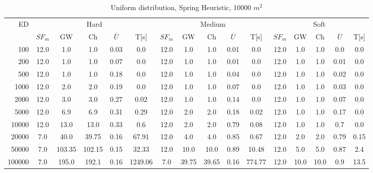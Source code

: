 \begin{table}[htb]
	\centering
	\begin{tabular}{|r|c|c|c|c|c|c|c|c|c|c|c|c|c|c|c|} 
		\multirow{2}{*}{ED} & \multicolumn{5}{c|}{Hard} & \multicolumn{5}{c|}{Medium} &\multicolumn{5}{c|}{Soft} \\ 
		\cline{2-16} 
		&$SF_{m}$&GW & Ch & $\overline{U}$&T[s] &$SF_{m}$&GW & Ch & $\overline{U}$ &T[s] &$SF_{m}$&GW & Ch & $\overline{U}$  & T[s]  \\ 
		\hline 
		100 & 12.0 & 1.0 & 1.0 & 0.03 & 0.0 & 12.0 & 1.0 & 1.0 & 0.01 & 0.0 & 12.0 & 1.0 & 1.0 & 0.0 & 0.0\\ 
		200 & 12.0 & 1.0 & 1.0 & 0.07 & 0.0 & 12.0 & 1.0 & 1.0 & 0.01 & 0.0 & 12.0 & 1.0 & 1.0 & 0.01 & 0.0\\ 
		500 & 12.0 & 1.0 & 1.0 & 0.18 & 0.0 & 12.0 & 1.0 & 1.0 & 0.04 & 0.0 & 12.0 & 1.0 & 1.0 & 0.02 & 0.0\\ 
		1000 & 12.0 & 2.0 & 2.0 & 0.19 & 0.0 & 12.0 & 1.0 & 1.0 & 0.07 & 0.0 & 12.0 & 1.0 & 1.0 & 0.03 & 0.0\\ 
		2000 & 12.0 & 3.0 & 3.0 & 0.27 & 0.02 & 12.0 & 1.0 & 1.0 & 0.14 & 0.0 & 12.0 & 1.0 & 1.0 & 0.07 & 0.0\\ 
		5000 & 12.0 & 6.9 & 6.9 & 0.31 & 0.29 & 12.0 & 2.0 & 2.0 & 0.18 & 0.02 & 12.0 & 1.0 & 1.0 & 0.17 & 0.0\\ 
		10000 & 12.0 & 13.0 & 13.0 & 0.33 & 0.6 & 12.0 & 2.0 & 2.0 & 0.79 & 0.08 & 12.0 & 1.0 & 1.0 & 0.7 & 0.0\\ 
		20000 & 7.0 & 40.0 & 39.75 & 0.16 & 67.91 & 12.0 & 4.0 & 4.0 & 0.85 & 0.67 & 12.0 & 2.0 & 2.0 & 0.79 & 0.15\\ 
		50000 & 7.0 & 103.35 & 102.15 & 0.15 & 32.33 & 12.0 & 10.0 & 10.0 & 0.89 & 10.48 & 12.0 & 5.0 & 5.0 & 0.87 & 2.4\\ 
		100000 & 7.0 & 195.0 & 192.1 & 0.16 & 1249.06 & 7.0 & 39.75 & 39.65 & 0.16 & 774.77 & 12.0 & 10.0 & 10.0 & 0.9 & 13.5\\ 
		\hline 
	\end{tabular} 
	\caption{Uniform distribution, Spring Heuristic, 10000 $m^2$} 
	\label{tab:UnSprings100} 
\end{table} 
